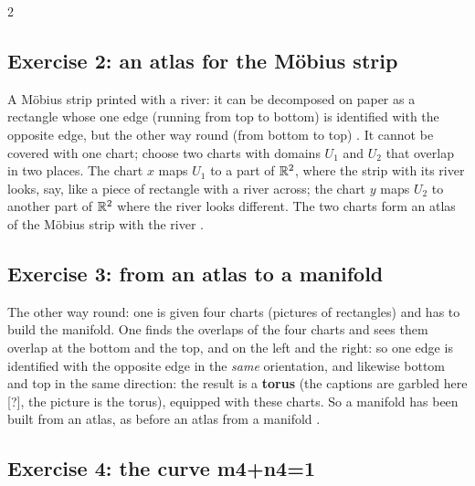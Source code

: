 \begin{paracol}{2}
\subsection*{Exercise 2: an atlas for the M\"obius strip}

A M\"obius strip printed with a river: it can be decomposed on paper as a rectangle whose one edge (running from top to bottom) is identified with the opposite edge, but the other way round (from bottom to top) .
It cannot be covered with one chart; choose two charts with domains $U_1$ and $U_2$ that overlap in two places. The chart $x$ maps $U_1$ to a part of $\mathbb{R}^2$, where the strip with its river looks, say, like a piece of rectangle with a river across; the chart $y$ maps $U_2$ to another part of $\mathbb{R}^2$ where the river looks
different. The two charts form an atlas of the M\"obius strip with the river .

\subsection*{Exercise 3: from an atlas to a manifold}

The other way round: one is given four charts (pictures of rectangles) and has to build the manifold. One finds the overlaps of the four charts and sees them overlap at the bottom and the top, and on the left and the right: so one edge is identified with the opposite edge in the \emph{same} orientation, and likewise
bottom and top in the same direction: the result is a \textbf{torus} (the captions are garbled here [?], the picture is the torus), equipped with these charts. So a manifold has been built from an atlas, as before an atlas from a manifold .

\subsection*{Exercise 4: the curve m4+n4=1}


\end{paracol}
